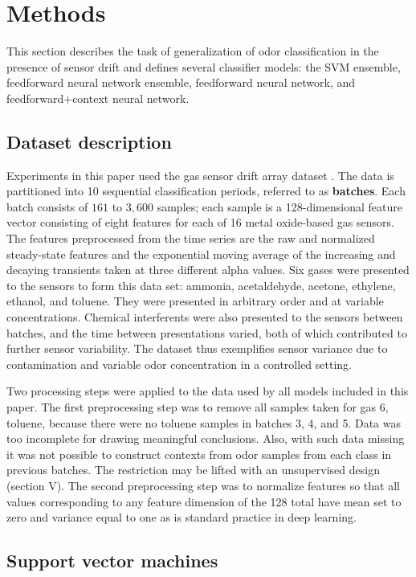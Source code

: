 \documentclass[onecolumn,pre,floats,aps,amsmath,amssymb,superscriptaddress]{revtex4-1}
\begin{document}
\section{Methods}
This section describes the task of generalization of odor classification in the presence of sensor drift and defines several classifier models: the SVM ensemble, feedforward neural network ensemble, feedforward neural network, and feedforward+context neural network.

\subsection{Dataset description}
Experiments in this paper used the gas sensor drift array dataset \cite{vergara_chemical_2012}. The data is partitioned into 10 sequential classification periods, referred to as \textbf{batches}. Each batch consists of $161$ to $3{,}600$ samples; each sample is a 128-dimensional feature vector consisting of eight features for each of 16 metal oxide-based gas sensors. The features preprocessed from the time series are the raw and normalized steady-state features and the exponential moving average of the increasing and decaying transients taken at three different alpha values. Six gases were presented to the sensors to form this data set: ammonia, acetaldehyde, acetone, ethylene, ethanol, and toluene. They were presented in arbitrary order and at variable concentrations. Chemical interferents were also presented to the sensors between batches, and the time between presentations varied, both of which contributed to further sensor variability. The dataset thus exemplifies sensor variance due to contamination and variable odor concentration in a controlled setting.

Two processing steps were applied to the data used by all models included in this paper. The first preprocessing step was to remove all samples taken for gas 6, toluene, because there were no toluene samples in batches 3, 4, and 5. Data was too incomplete for drawing meaningful conclusions. Also, with such data missing it was not possible to construct contexts from odor samples from each class in previous batches. The restriction may be lifted with an unsupervised design (section V). The second preprocessing step was to normalize features so that all values corresponding to any feature dimension of the 128 total have mean set to zero and variance equal to one as is standard practice in deep learning. 

\subsection{Support vector machines}
\end{document}
